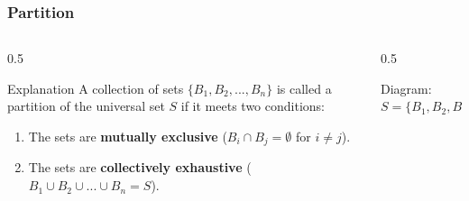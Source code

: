 \begin{frame}
    \frametitle{Partition}
    
    \begin{columns}[T]
        \begin{column}{0.5\textwidth}
            \begin{block}{Explanation}
                A collection of sets \(\{B_1, B_2, ..., B_n\}\) is called a partition of the universal set $S$ if it meets two conditions:
                \begin{enumerate}
                    \item The sets are \textbf{mutually exclusive} (\(B_i \cap B_j = \emptyset\) for \(i \neq j\)).
                    \item The sets are \textbf{collectively exhaustive} (\(B_1 \cup B_2 \cup ... \cup B_n = S\)).
                \end{enumerate}
            \end{block}
        \end{column}
        
        \begin{column}{0.5\textwidth}
            \begin{block}{Diagram: \(S=\{B_1,B_2,B_3\}\)}
                \centering
            \end{block}
        \end{column}
    \end{columns}
\end{frame}

